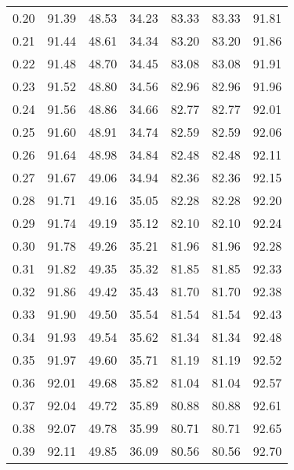 \begin{tabular}{|c|c|c|c|c|c|c|}
      0.20 &     91.39 &     48.53 &      34.23 &   83.33 &      83.33 &         91.81 \\
      0.21 &     91.44 &     48.61 &      34.34 &   83.20 &      83.20 &         91.86 \\
      0.22 &     91.48 &     48.70 &      34.45 &   83.08 &      83.08 &         91.91 \\
      0.23 &     91.52 &     48.80 &      34.56 &   82.96 &      82.96 &         91.96 \\
      0.24 &     91.56 &     48.86 &      34.66 &   82.77 &      82.77 &         92.01 \\
      0.25 &     91.60 &     48.91 &      34.74 &   82.59 &      82.59 &         92.06 \\
      0.26 &     91.64 &     48.98 &      34.84 &   82.48 &      82.48 &         92.11 \\
      0.27 &     91.67 &     49.06 &      34.94 &   82.36 &      82.36 &         92.15 \\
      0.28 &     91.71 &     49.16 &      35.05 &   82.28 &      82.28 &         92.20 \\
      0.29 &     91.74 &     49.19 &      35.12 &   82.10 &      82.10 &         92.24 \\
      0.30 &     91.78 &     49.26 &      35.21 &   81.96 &      81.96 &         92.28 \\
      0.31 &     91.82 &     49.35 &      35.32 &   81.85 &      81.85 &         92.33 \\
      0.32 &     91.86 &     49.42 &      35.43 &   81.70 &      81.70 &         92.38 \\
      0.33 &     91.90 &     49.50 &      35.54 &   81.54 &      81.54 &         92.43 \\
      0.34 &     91.93 &     49.54 &      35.62 &   81.34 &      81.34 &         92.48 \\
      0.35 &     91.97 &     49.60 &      35.71 &   81.19 &      81.19 &         92.52 \\
      0.36 &     92.01 &     49.68 &      35.82 &   81.04 &      81.04 &         92.57 \\
      0.37 &     92.04 &     49.72 &      35.89 &   80.88 &      80.88 &         92.61 \\
      0.38 &     92.07 &     49.78 &      35.99 &   80.71 &      80.71 &         92.65 \\
      0.39 &     92.11 &     49.85 &      36.09 &   80.56 &      80.56 &         92.70 \\

\end{tabular}

